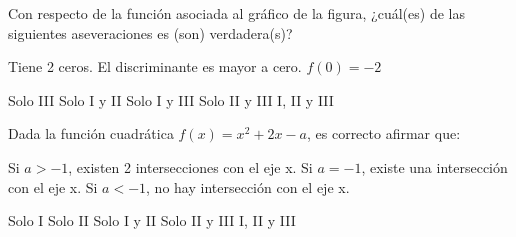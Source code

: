 \documentclass[sin nombre]{srs2}
\begin{document}
\begin{preguntas}
\pregunta Con respecto de la función asociada al gráfico de la figura, ¿cuál(es) de las siguientes aseveraciones es (son) verdadera(s)?
\begin{columnas}[0.6]
\begin{opciones}
\opcion Tiene 2 ceros.
\opcion El discriminante es mayor a cero.
\opcion $f\left(0\right) = -2$
\end{opciones}
\begin{alternativas}
\alternativa Solo III
\alternativa Solo I y II
\alternativa Solo I y III
\alternativa Solo II y III
\alternativa I, II y III
\end{alternativas}
\siguiente
{}
\end{columnas}

\pregunta Dada la función cuadrática $f\left(x\right) = x^2 + 2x - a$, es correcto afirmar que:
\begin{opciones}
\opcion Si $a > -1$, existen 2 intersecciones con el eje x.
\opcion Si $a = -1$, existe una intersección con el eje x.
\opcion Si $a < -1$, no hay intersección con el eje x.
\end{opciones}
\begin{alternativas}
\alternativa Solo I
\alternativa Solo II
\alternativa Solo I y II
\alternativa Solo II y III
\alternativa I, II y III
\end{alternativas}


\end{preguntas}
\end{document}
